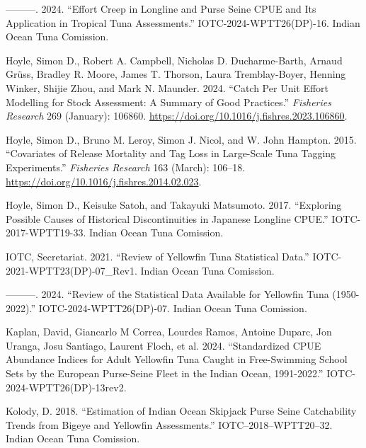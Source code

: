 \documentclass[
]{scrartcl}
\newlength{\cslhangindent}
\newenvironment{CSLReferences}[2] %
 {\begin{list}{}{%
  \setlength{\itemindent}{0pt}
  \setlength{\leftmargin}{0pt}
  \setlength{\parsep}{0pt}
  \ifodd #1
   \setlength{\leftmargin}{\cslhangindent}
   \setlength{\itemindent}{-1\cslhangindent}
  \fi
  \setlength{\itemsep}{#2\baselineskip}}}
 {\end{list}}
\begin{document}
\begin{CSLReferences}{1}{0}
---------. 2024. {``Effort Creep in Longline and Purse Seine {CPUE} and
Its Application in Tropical Tuna Assessments.''}
IOTC-2024-WPTT26(DP)-16. Indian Ocean Tuna Comission.

Hoyle, Simon D., Robert A. Campbell, Nicholas D. Ducharme-Barth, Arnaud
Grüss, Bradley R. Moore, James T. Thorson, Laura Tremblay-Boyer, Henning
Winker, Shijie Zhou, and Mark N. Maunder. 2024. {``Catch Per Unit Effort
Modelling for Stock Assessment: {A} Summary of Good Practices.''}
\emph{Fisheries Research} 269 (January): 106860.
\url{https://doi.org/10.1016/j.fishres.2023.106860}.

Hoyle, Simon D., Bruno M. Leroy, Simon J. Nicol, and W. John Hampton.
2015. {``Covariates of Release Mortality and Tag Loss in Large-Scale
Tuna Tagging Experiments.''} \emph{Fisheries Research} 163 (March):
106--18. \url{https://doi.org/10.1016/j.fishres.2014.02.023}.

Hoyle, Simon D., Keisuke Satoh, and Takayuki Matsumoto. 2017.
{``Exploring Possible Causes of Historical Discontinuities in {Japanese}
Longline {CPUE}.''} IOTC-2017-WPTT19-33. Indian Ocean Tuna Comission.

IOTC, Secretariat. 2021. {``Review of {Yellowfin Tuna Statistical
Data}.''} IOTC-2021-WPTT23(DP)-07\_Rev1. Indian Ocean Tuna Comission.

---------. 2024. {``Review of the Statistical Data Available for
Yellowfin Tuna (1950-2022).''} IOTC-2024-WPTT26(DP)-07. Indian Ocean
Tuna Comission.

Kaplan, David, Giancarlo M Correa, Lourdes Ramos, Antoine Duparc, Jon
Uranga, Josu Santiago, Laurent Floch, et al. 2024. {``Standardized
{CPUE} Abundance Indices for Adult Yellowfin Tuna Caught in
Free-Swimming School Sets by the {European} Purse-Seine Fleet in the
{Indian Ocean}, 1991-2022.''} IOTC-2024-WPTT26(DP)-13rev2.

Kolody, D. 2018. {``Estimation of {Indian Ocean Skipjack Purse Seine
Catchability Trends} from {Bigeye} and {Yellowfin Assessments}.''}
IOTC--2018--WPTT20--32. Indian Ocean Tuna Comission.


\end{CSLReferences}
\end{document}
